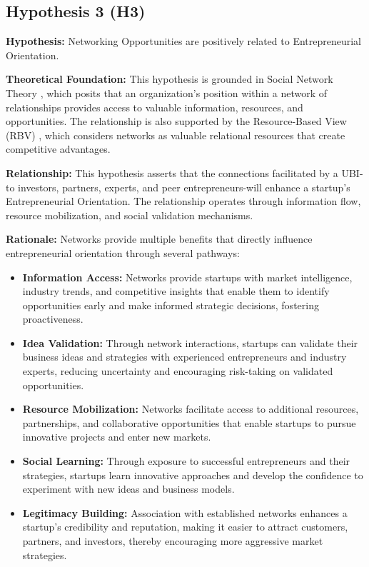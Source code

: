 \documentclass[../Main.tex]{subfiles}
\begin{document}
    \subsection{Hypothesis 3 (H3)}
    \textbf{Hypothesis:} Networking Opportunities are positively related to Entrepreneurial Orientation.
    
    \textbf{Theoretical Foundation:} This hypothesis is grounded in Social Network Theory \cite{granovetter1973strength}, which posits that an organization's position within a network of relationships provides access to valuable information, resources, and opportunities. The relationship is also supported by the Resource-Based View (RBV) \cite{barney1991firm}, which considers networks as valuable relational resources that create competitive advantages.
    
    \textbf{Relationship:} This hypothesis asserts that the connections facilitated by a UBI-to investors, partners, experts, and peer entrepreneurs-will enhance a startup's Entrepreneurial Orientation. The relationship operates through information flow, resource mobilization, and social validation mechanisms.
    
    \textbf{Rationale:} Networks provide multiple benefits that directly influence entrepreneurial orientation through several pathways:
    \begin{itemize}
        \item \textbf{Information Access:} Networks provide startups with market intelligence, industry trends, and competitive insights that enable them to identify opportunities early and make informed strategic decisions, fostering proactiveness.
        \item \textbf{Idea Validation:} Through network interactions, startups can validate their business ideas and strategies with experienced entrepreneurs and industry experts, reducing uncertainty and encouraging risk-taking on validated opportunities.
        \item \textbf{Resource Mobilization:} Networks facilitate access to additional resources, partnerships, and collaborative opportunities that enable startups to pursue innovative projects and enter new markets.
        \item \textbf{Social Learning:} Through exposure to successful entrepreneurs and their strategies, startups learn innovative approaches and develop the confidence to experiment with new ideas and business models.
        \item \textbf{Legitimacy Building:} Association with established networks enhances a startup's credibility and reputation, making it easier to attract customers, partners, and investors, thereby encouraging more aggressive market strategies.
    \end{itemize}
    
\end{document}
